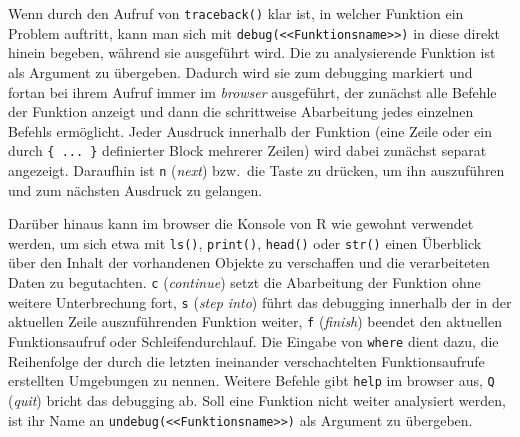 Wenn durch den Aufruf von \lstinline!traceback()! klar ist, in welcher Funktion ein Problem auftritt, kann man sich mit  \lstinline!debug(<<Funktionsname>>)! in diese direkt hinein begeben, während sie ausgeführt wird. Die zu analysierende Funktion ist als Argument zu übergeben. Dadurch wird sie zum debugging markiert und fortan bei ihrem Aufruf immer im \emph{browser} ausgeführt, der zunächst alle Befehle der Funktion anzeigt und dann die schrittweise Abarbeitung jedes einzelnen Befehls ermöglicht. Jeder Ausdruck innerhalb der Funktion (eine Zeile oder ein durch \lstinline!{ ... }! definierter Block mehrerer Zeilen) wird dabei zunächst separat angezeigt. Daraufhin ist \lstinline!n! (\emph{next}) bzw.\ die  Taste zu drücken, um ihn auszuführen und zum nächsten Ausdruck zu gelangen.

Darüber hinaus kann im browser die Konsole von R wie gewohnt verwendet werden, um sich etwa mit \lstinline!ls()!, \lstinline!print()!, \lstinline!head()! oder \lstinline!str()! einen Überblick über den Inhalt der vorhandenen Objekte zu verschaffen und die verarbeiteten Daten zu begutachten. \lstinline!c! (\emph{continue}) setzt die Abarbeitung der Funktion ohne weitere Unterbrechung fort, \lstinline!s! (\emph{step into}) führt das debugging innerhalb der in der aktuellen Zeile auszuführenden Funktion weiter, \lstinline!f! (\emph{finish}) beendet den aktuellen Funktionsaufruf oder Schleifendurchlauf. Die Eingabe von \lstinline!where! dient dazu, die Reihenfolge der durch die letzten ineinander verschachtelten Funktionsaufrufe erstellten Umgebungen zu nennen. Weitere Befehle gibt \lstinline!help! im browser aus, \lstinline!Q! (\emph{quit}) bricht das debugging ab. Soll eine Funktion nicht weiter analysiert werden, ist ihr Name an  \lstinline!undebug(<<Funktionsname>>)! als Argument zu übergeben.


